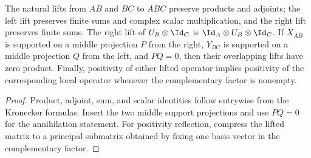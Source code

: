 \begin{lemma}%
    \label{lem:overlapping_lift_algebra}
    \leanok
    The natural lifts from $AB$ and $BC$ to $ABC$ preserve products and
    adjoints; the left lift preserves finite sums and complex scalar
    multiplication, and the right lift preserves finite sums.  The right lift
    of $U_B\otimes\Id_C$ is
    $\Id_A\otimes U_B\otimes\Id_C$.  If $X_{AB}$ is supported on a middle
    projection $P$ from the right, $Y_{BC}$ is supported on a middle projection
    $Q$ from the left, and $PQ=0$, then their overlapping lifts have zero
    product.  Finally, positivity of either lifted operator implies positivity
    of the corresponding local operator whenever the complementary factor is
    nonempty.
\end{lemma}

\begin{proof}
    \leanok
    Product, adjoint, sum, and scalar identities follow entrywise from the
    Kronecker formulas.  Insert the two middle support projections and use
    $PQ=0$ for the annihilation statement.  For positivity reflection, compress
    the lifted matrix to a principal submatrix obtained by fixing one basis
    vector in the complementary factor.
\end{proof}

